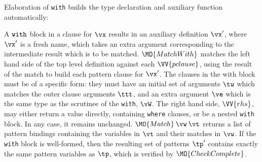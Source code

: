 \noindent
Elaboration of \texttt{with} builds the type declaration and auxiliary function
automatically:



A $\mathtt{with}$ block in a clause for $\vx$
results in an auxiliary definition $\vx'$, where $\vx'$ is a fresh name,
which takes an extra argument corresponding to the intermediate result which
is to be matched.
$\MO{MatchWith}$ matches the left hand side of the top level definition against
each $\VV{pclause}$, using the result of the match to build each pattern clause
for $\vx'$. 
The clauses in the with block must be of a specific form: they must have an initial
set of arguments $\tw$ which matches the outer clause arguments
$\ttt$, and an extra argument
$\ve$ which is the same type as the scrutinee of the \texttt{with}, $\vW$.
The right hand side, $\VV{rhs}$, may either return a value directly, containing 
\texttt{where} clauses, or be a nested \texttt{with} block. In any case, it
remains unchanged.
$\MO{Match}\:\vw\:\vt$ returns a list of pattern bindings containing
the variables in $\vt$ and their matches in $\vw$.
If the \texttt{with} block is well-formed, then
the resulting set of patterns $\tp'$ contains exactly the same pattern variables
as $\tp$, which is verified by $\MO{CheckComplete}$.


